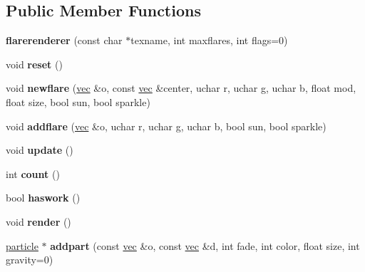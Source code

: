 \subsection*{Public Member Functions}
\begin{DoxyCompactItemize}
\item 
\mbox{\label{structflarerenderer_ac97df023d8f71a1c1ec054f553717327}} 
{\bfseries flarerenderer} (const char $\ast$texname, int maxflares, int flags=0)
\item 
\mbox{\label{structflarerenderer_a507f569a42c4691c36d18a11be02f568}} 
void {\bfseries reset} ()
\item 
\mbox{\label{structflarerenderer_a619a5cbea2fc100eea3e6719faf20560}} 
void {\bfseries newflare} (\hyperlink{structvec}{vec} \&o, const \hyperlink{structvec}{vec} \&center, uchar r, uchar g, uchar b, float mod, float size, bool sun, bool sparkle)
\item 
\mbox{\label{structflarerenderer_a5728a8911a1b72baff700f7ed62bc170}} 
void {\bfseries addflare} (\hyperlink{structvec}{vec} \&o, uchar r, uchar g, uchar b, bool sun, bool sparkle)
\item 
\mbox{\label{structflarerenderer_ace67d99d288d22df7474fc6bf29e4a0c}} 
void {\bfseries update} ()
\item 
\mbox{\label{structflarerenderer_a873860d2dfe149a5dd25507adc8d0be3}} 
int {\bfseries count} ()
\item 
\mbox{\label{structflarerenderer_af4c0e43f0d812d08fe5ace60253d5fff}} 
bool {\bfseries haswork} ()
\item 
\mbox{\label{structflarerenderer_adaca66769e01a785c13665807578f746}} 
void {\bfseries render} ()
\item 
\mbox{\label{structflarerenderer_a056b5bf69a27848ce80f40e0d0288b76}} 
\hyperlink{structparticle}{particle} $\ast$ {\bfseries addpart} (const \hyperlink{structvec}{vec} \&o, const \hyperlink{structvec}{vec} \&d, int fade, int color, float size, int gravity=0)
\end{DoxyCompactItemize}
